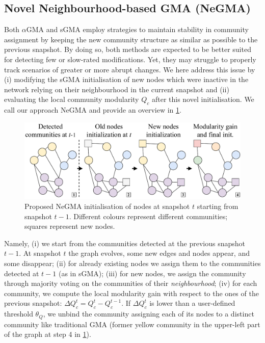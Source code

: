 \documentclass[letterpaper]{article}
\begin{document}
\subsection{Novel Neighbourhood-based GMA (NeGMA)}

Both $\alpha$GMA and sGMA employ strategies to maintain stability in community assignment by keeping the new community structure as similar as possible to the previous snapshot. By doing so, both methods are expected to be better suited for detecting few or slow-rated modifications. Yet, they may struggle to properly track scenarios of greater or more abrupt changes.
We here address this issue by (i) modifying the sGMA initialisation of new nodes which were inactive in the network relying on their neighbourhood in the current snapshot and (ii) evaluating the local community modularity $Q_c$ after this novel initialisation.
We call our approach NeGMA and provide an overview in \cref{fig:negma}.

\begin{figure}[!t]
    \centering
    \includegraphics[width=\linewidth]{figures/negma.pdf}
    \caption{Proposed NeGMA initialisation of nodes at snapshot $t$ starting from snapshot $t-1$. Different colours represent different communities; squares represent new nodes.}
    \label{fig:negma}
\end{figure}

Namely, (i) we start from the communities detected at the previous snapshot $t-1$. At snapshot $t$ the graph evolves, some new edges and nodes appear, and some disappear; (ii) for already existing nodes we assign them to the communities detected at $t-1$ (as in sGMA); (iii) for new nodes, we assign the community through majority voting on the communities of their \emph{neighbourhood}; (iv) for each community, we compute the local modularity gain with respect to the ones of the previous snapshot: $\Delta Q_c^t = Q_c^{t} - Q_c^{t-1}$. If $\Delta Q_c^t$ is lower than a user-defined threshold $\theta_Q$, we unbind the community assigning each of its nodes to a distinct community like traditional GMA (former yellow community in the upper-left part of the graph at step 4 in \cref{fig:negma}).
\end{document}
